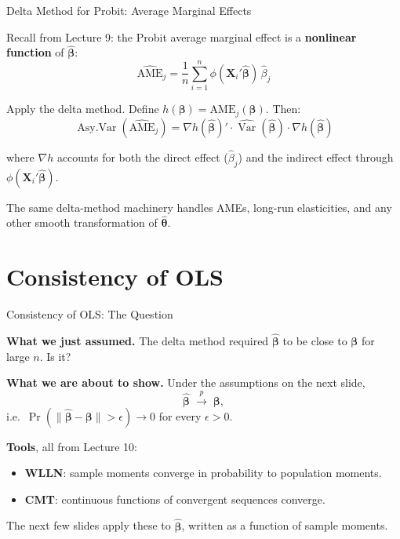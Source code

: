 \documentclass[aspectratio=169, handout, t]{beamer}
\numberwithin{equation}{section}
\begin{document}

\begin{frame}{Delta Method for Probit: Average Marginal Effects}

Recall from Lecture 9: the Probit average marginal effect is a \textbf{nonlinear function} of $\hat{\bm{\beta}}$:
\[
\widehat{\text{AME}}_j = \frac{1}{n}\sum_{i=1}^n \phi(\bm{X}_i'\hat{\bm{\beta}})\,\hat{\beta}_j
\]

\pause

Apply the delta method. Define $h(\bm{\beta}) = \text{AME}_j(\bm{\beta})$. Then:
\[
\operatorname{Asy.Var}(\widehat{\text{AME}}_j) = \nabla h(\hat{\bm{\beta}})' \cdot \widehat{\operatorname{Var}}(\hat{\bm{\beta}}) \cdot \nabla h(\hat{\bm{\beta}})
\]

\pause

where $\nabla h$ accounts for both the direct effect ($\hat{\beta}_j$) and the indirect effect through $\phi(\bm{X}_i'\hat{\bm{\beta}})$.

\pause

\begin{tcolorbox}[colback=blue!5, colframe=blue!50]
The same delta-method machinery handles AMEs, long-run elasticities, and any other smooth transformation of $\hat{\bm{\theta}}$.
\end{tcolorbox}

\end{frame}

\section{Consistency of OLS}

\begin{frame}{Consistency of OLS: The Question}

\textbf{What we just assumed.} The delta method required $\hat{\bm{\beta}}$ to be close to $\bm{\beta}$ for large $n$. Is it?

\pause

\medskip

\textbf{What we are about to show.} Under the assumptions on the next slide,
\[
\hat{\bm{\beta}} \;\overset{p}{\to}\; \bm{\beta},
\]
i.e.\ $\Pr(\|\hat{\bm{\beta}} - \bm{\beta}\| > \epsilon) \to 0$ for every $\epsilon > 0$.

\pause

\medskip

\textbf{Tools}, all from Lecture 10:
\begin{itemize}\setlength\itemsep{2pt}
\item \textbf{WLLN}: sample moments converge in probability to population moments.
\item \textbf{CMT}: continuous functions of convergent sequences converge.
\end{itemize}
The next few slides apply these to $\hat{\bm{\beta}}$, written as a function of sample moments.

\end{frame}
\end{document}
